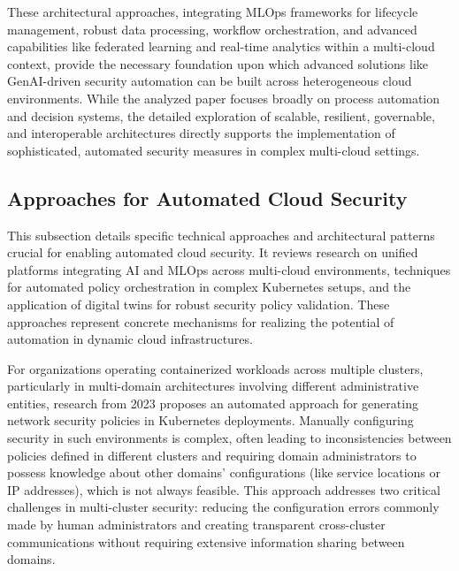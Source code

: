 These architectural approaches, integrating MLOps frameworks for lifecycle management, robust data processing, workflow orchestration, and advanced capabilities like federated learning and real-time analytics within a multi-cloud context, provide the necessary foundation upon which advanced solutions like GenAI-driven security automation can be built across heterogeneous cloud environments\cite{sushil_prabhu_prabhakaran_integration_2024}. While the analyzed paper focuses broadly on process automation and decision systems, the detailed exploration of scalable, resilient, governable, and interoperable architectures directly supports the implementation of sophisticated, automated security measures in complex multi-cloud settings\cite{sushil_prabhu_prabhakaran_integration_2024}.


\subsection{Approaches for Automated Cloud Security} %
\label{sec:Approaches for Automated Cloud Security}

This subsection details specific technical approaches and architectural patterns crucial for enabling automated cloud security. It reviews research on unified platforms integrating AI and MLOps across multi-cloud environments, techniques for automated policy orchestration in complex Kubernetes setups, and the application of digital twins for robust security policy validation. These approaches represent concrete mechanisms for realizing the potential of automation in dynamic cloud infrastructures.

For organizations operating containerized workloads across multiple clusters, particularly in multi-domain architectures involving different administrative entities, research from 2023 proposes an automated approach for generating network security policies in Kubernetes deployments\cite{bringhenti_security_2023}. Manually configuring security in such environments is complex, often leading to inconsistencies between policies defined in different clusters and requiring domain administrators to possess knowledge about other domains' configurations (like service locations or IP addresses), which is not always feasible\cite{bringhenti_security_2023}. This approach addresses two critical challenges in multi-cluster security: reducing the configuration errors commonly made by human administrators and creating transparent cross-cluster communications without requiring extensive information sharing between domains\cite{bringhenti_security_2023}.

